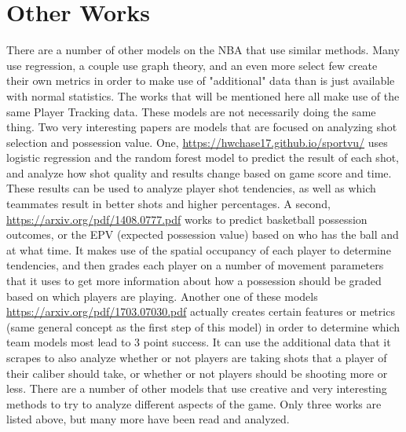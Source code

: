 \documentclass{article}
\begin{document}
\section*{Other Works}
There are a number of other models on the NBA that use similar methods.  Many use regression, a couple use graph theory, and an even more select few create their own metrics in order to make use of "additional" data than is just available with normal statistics.  The works that will be mentioned here all make use of the same Player Tracking data.
\newline 
These models are not necessarily doing the same thing.  Two very interesting papers are models that are focused on analyzing shot selection and possession value.  One, 
\url{https://hwchase17.github.io/sportvu/} uses logistic regression and the random forest model to predict the result of each shot, and analyze how shot quality and results change based on game score and time.  These results can be used to analyze player shot tendencies, as well as which teammates result in better shots and higher percentages.  A second, \url{https://arxiv.org/pdf/1408.0777.pdf} works to predict basketball possession outcomes, or the EPV (expected possession value) based on who has the ball and at what time.  It makes use of the spatial occupancy of each player to determine tendencies, and then grades each player on a number of movement parameters that it uses to get more information about how a possession should be graded based on which players are playing.  Another one of these models \url{https://arxiv.org/pdf/1703.07030.pdf} actually creates certain features or metrics (same general concept as the first step of this model) in order to determine which team models most lead to 3 point success.  It can use the additional data that it scrapes to also analyze whether or not players are taking shots that a player of their caliber should take, or whether or not players should be shooting more or less.
\newline 
There are a number of other models that use creative and very interesting methods to try to analyze different aspects of the game.  Only three works are listed above, but many more have been read and analyzed.
\end{document}
